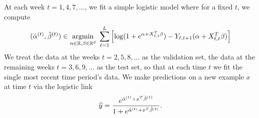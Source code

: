 At each week $t = 1, 4, 7, \ldots$, 
we fit a simple logistic model where for a fixed $t$, we compute
\begin{equation}
  \label{eqn:logistic-goof}
  (\hat \alpha^{(t)}, \hat \beta^{(t)}) \in
  \mathop{\rm argmin}_{\alpha \in \mathbb{R}, \beta \in \mathbb{R}^d}
  ~
  \sum_{\ell = 1}^L
  \left[\log(1 + e^{\alpha + X_{\ell,t}^T \beta}) -
    Y_{\ell,t+1} (\alpha + X_{\ell,t}^T \beta)\right]
\end{equation}
We treat the data at the weeks $t=2,5,8,\ldots$ as the validation set, the
data at the remaining weeks $t=3,6,9,\ldots$ as the test set, so that at
each time $t$ we fit the single most recent time period's data. We make
predictions on a new example $x$ at time $t$ via the logistic link
\begin{equation*}
  \widehat{y} = \frac{e^{\hat{\alpha}^{(t)} + x^T \hat{\beta}^{(t)}}}{1 +
    e^{\hat{\alpha}^{(t)} + x^T \hat{\beta}^{(t)}}}.
\end{equation*}



